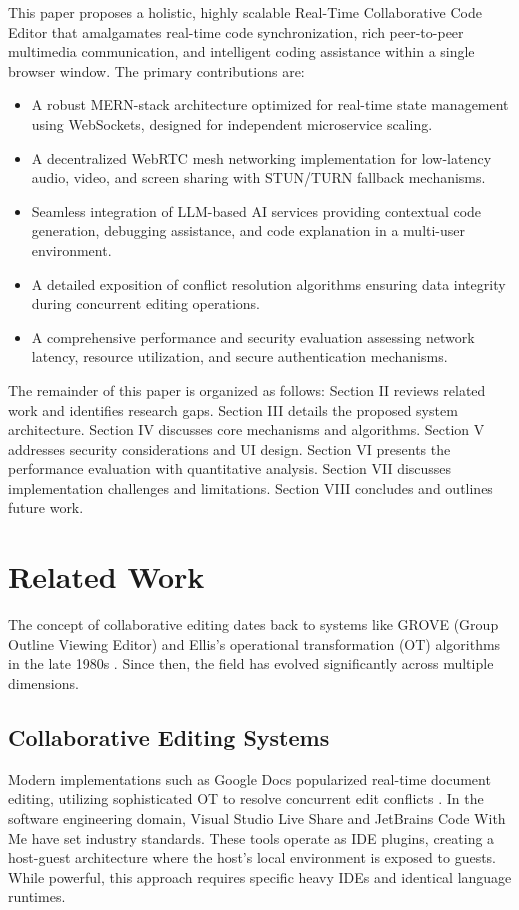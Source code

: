 \documentclass[conference]{IEEEtran}
\begin{document}
This paper proposes a holistic, highly scalable Real-Time Collaborative Code Editor that amalgamates real-time code synchronization, rich peer-to-peer multimedia communication, and intelligent coding assistance within a single browser window. The primary contributions are:
\begin{itemize}
    \item A robust MERN-stack architecture optimized for real-time state management using WebSockets, designed for independent microservice scaling.
    \item A decentralized WebRTC mesh networking implementation for low-latency audio, video, and screen sharing with STUN/TURN fallback mechanisms.
    \item Seamless integration of LLM-based AI services providing contextual code generation, debugging assistance, and code explanation in a multi-user environment.
    \item A detailed exposition of conflict resolution algorithms ensuring data integrity during concurrent editing operations.
    \item A comprehensive performance and security evaluation assessing network latency, resource utilization, and secure authentication mechanisms.
\end{itemize}

The remainder of this paper is organized as follows: Section II reviews related work and identifies research gaps. Section III details the proposed system architecture. Section IV discusses core mechanisms and algorithms. Section V addresses security considerations and UI design. Section VI presents the performance evaluation with quantitative analysis. Section VII discusses implementation challenges and limitations. Section VIII concludes and outlines future work.

\section{Related Work}
The concept of collaborative editing dates back to systems like GROVE (Group Outline Viewing Editor) and Ellis's operational transformation (OT) algorithms in the late 1980s \cite{b1}. Since then, the field has evolved significantly across multiple dimensions.

\subsection{Collaborative Editing Systems}
Modern implementations such as Google Docs popularized real-time document editing, utilizing sophisticated OT to resolve concurrent edit conflicts \cite{b2}. In the software engineering domain, Visual Studio Live Share and JetBrains Code With Me have set industry standards. These tools operate as IDE plugins, creating a host-guest architecture where the host's local environment is exposed to guests. While powerful, this approach requires specific heavy IDEs and identical language runtimes.
\end{document}
